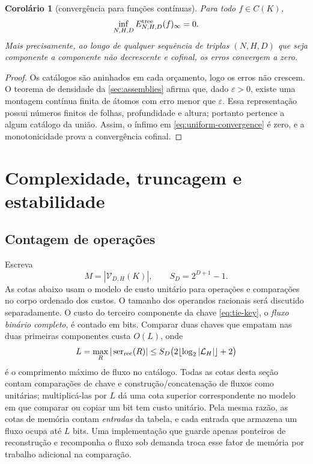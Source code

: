 \documentclass[11pt,a4paper]{article}
\newtheorem{corollary}[theorem]{Corolário}
\theoremstyle{definition}
\theoremstyle{remark}
\newcommand{\Library}{\mathcal{L}}
\newcommand{\Values}{\mathcal{V}}
\newcommand{\ser}{\operatorname{ser}}
\begin{document}
\begin{corollary}[convergência para funções contínuas]
\label{cor:uniform-convergence}
Para todo $f\in C(K)$,
\begin{equation}
 \inf_{N,H,D}E_{N,H,D}^{\rm tree}(f)_\infty=0.
 \label{eq:uniform-convergence}
\end{equation}
Mais precisamente, ao longo de qualquer sequência de triplas $(N,H,D)$ que
seja componente a componente não decrescente e cofinal, os erros convergem a
zero.
\end{corollary}

\begin{proof}
Os catálogos são aninhados em cada orçamento, logo os erros não crescem. O
teorema de densidade da \cref{sec:assemblies} afirma que, dado $\varepsilon>0$,
existe uma montagem contínua finita de átomos com erro menor que
$\varepsilon$. Essa representação possui números finitos de folhas,
profundidade e altura; portanto pertence a algum catálogo da união. Assim, o
ínfimo em \eqref{eq:uniform-convergence} é zero, e a monotonicidade prova a
convergência cofinal.
\end{proof}

\section{Complexidade, truncagem e estabilidade}
\label{sec:complexity-dp}

\subsection{Contagem de operações}

Escreva
\[
 M=|\Values_{D,H}(K)|,\qquad S_D=2^{D+1}-1.
\]
As cotas abaixo usam o modelo de custo unitário para operações e comparações
no corpo ordenado dos custos. O tamanho dos operandos racionais será discutido
separadamente. O custo do terceiro componente da chave \eqref{eq:tie-key}, o
\emph{fluxo binário completo}, é contado em bits. Comparar duas
chaves que empatam nas duas primeiras componentes custa
$O(L)$, onde
\begin{equation}
 L=\max_R|\ser_{\rm rec}(R)|
 \le S_D\bigl(2\lfloor\log_2|\Library_H|\rfloor+2\bigr)
 \label{eq:stream-length}
\end{equation}
é o comprimento máximo de fluxo no catálogo. Todas as cotas desta seção contam
comparações de chave e construção/concatenação de fluxos como unitárias;
multiplicá-las por $L$ dá uma cota superior correspondente no modelo em que
comparar ou copiar um bit tem custo unitário.
Pela mesma razão, as cotas de memória contam \emph{entradas} da tabela, e cada
entrada que armazena um fluxo ocupa até $L$ bits. Uma implementação que
guarde apenas ponteiros de reconstrução e recomponha o fluxo sob demanda
troca esse fator de memória por trabalho adicional na comparação.
\end{document}
